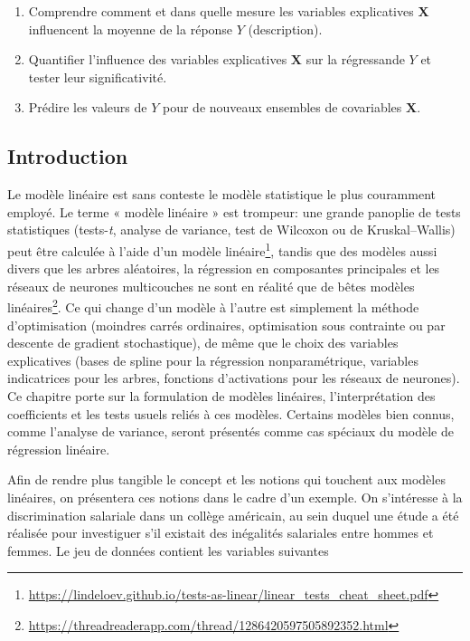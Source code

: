 \documentclass[
  11pt,
  letterpaper,
]{article}
\providecommand{\tightlist}{%
  \setlength{\itemsep}{0pt}\setlength{\parskip}{0pt}}
\renewcommand{\href}[2]{#2\footnote{\url{#1}}}
\theoremstyle{definition}
\theoremstyle{definition}
\theoremstyle{definition}
\theoremstyle{remark}
\begin{document}
\begin{enumerate}
\def\labelenumi{\arabic{enumi}.}
\tightlist
\item
  Comprendre comment et dans quelle mesure les variables explicatives \(\mathbf{X}\) influencent la moyenne de la réponse \(Y\) (description).
\item
  Quantifier l'influence des variables explicatives \(\mathbf{X}\) sur la régressande \(Y\) et tester leur significativité.
\item
  Prédire les valeurs de \(Y\) pour de nouveaux ensembles de covariables \(\mathbf{X}\).
\end{enumerate}

\hypertarget{introduction}{%
\subsection{Introduction}\label{introduction}}

Le modèle linéaire est sans conteste le modèle statistique le plus couramment employé. Le terme « modèle linéaire » est trompeur: une grande panoplie de tests statistiques (tests-\emph{t}, analyse de variance, test de Wilcoxon ou de Kruskal--Wallis) \href{https://lindeloev.github.io/tests-as-linear/linear_tests_cheat_sheet.pdf}{peut être calculée à l'aide d'un modèle linéaire}, tandis que \href{https://threadreaderapp.com/thread/1286420597505892352.html}{des modèles aussi divers que les arbres aléatoires, la régression en composantes principales et les réseaux de neurones multicouches ne sont en réalité que de bêtes modèles linéaires}. Ce qui change d'un modèle à l'autre est simplement la méthode d'optimisation (moindres carrés ordinaires, optimisation sous contrainte ou par descente de gradient stochastique), de même que le choix des variables explicatives (bases de spline pour la régression nonparamétrique, variables indicatrices pour les arbres, fonctions d'activations pour les réseaux de neurones). Ce chapitre porte sur la formulation de modèles linéaires, l'interprétation des coefficients et les tests usuels reliés à ces modèles. Certains modèles bien connus, comme l'analyse de variance, seront présentés comme cas spéciaux du modèle de régression linéaire.

Afin de rendre plus tangible le concept et les notions qui touchent aux modèles linéaires, on présentera ces notions dans le cadre d'un exemple. On s'intéresse à la discrimination salariale dans un collège américain, au sein duquel une étude a été réalisée pour investiguer s'il existait des inégalités salariales entre hommes et femmes. Le jeu de données contient les variables suivantes
\end{document}
